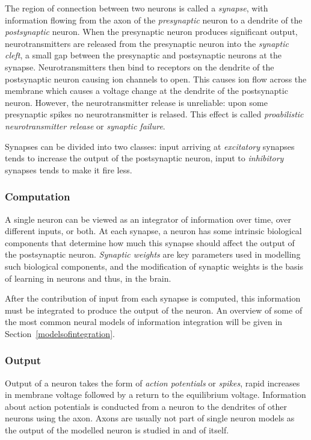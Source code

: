 \documentclass[a4paper,12pt]{report}
\theoremstyle{definition}
\begin{document}
The region of connection between two neurons is called a \emph{synapse}, with information flowing from the axon of the \emph{presynaptic} neuron to a dendrite of the \emph{postsynaptic} neuron. When the presynaptic neuron produces significant output, neurotransmitters are released from the presynaptic neuron into the \emph{synaptic cleft}, a small gap between the presynaptic and postsynaptic neurons at the synapse.
Neurotransmitters then bind to receptors on the dendrite of the postsynaptic neuron causing ion channels to open. This causes ion flow across the membrane which causes a voltage change at the dendrite of the postsynaptic neuron. However, the neurotransmitter release is unreliable: upon some presynaptic spikes no neurotransmitter is relased. This effect is called \emph{proabilistic neurotransmitter release} or \emph{synaptic failure}.

Synapses can be divided into two classes: input arriving at \emph{excitatory} synapses tends to increase the output of the postsynaptic neuron, input to \emph{inhibitory} synapses tends to make it fire less.

\subsubsection{Computation}
A single neuron can be viewed as an integrator of information over time, over different inputs, or both. At each synapse, a neuron has some intrinsic biological components that determine how much this synapse should affect the output of the postsynaptic neuron. \emph{Synaptic weights} are key parameters used in modelling such biological components, and the modification of synaptic weights is the basis of learning in neurons and thus, in the brain.

After the contribution of input from each synapse is computed, this information must be integrated to produce the output of the neuron. An overview of some of the most common neural models of information integration will be given in Section~\ref{modelsofintegration}.

\subsubsection{Output}

Output of a neuron takes the form of \emph{action potentials} or \emph{spikes}, rapid increases in membrane voltage followed by a return to the equilibrium voltage. Information about action potentials is conducted from a neuron to the dendrites of other neurons using the axon. Axons are usually not part of single neuron models as the output of the modelled neuron is studied in and of itself.
\end{document}
